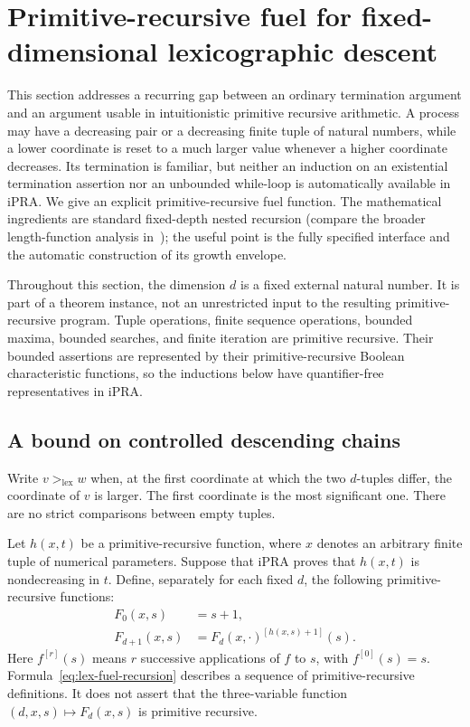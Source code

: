 \section{Primitive-recursive fuel for fixed-dimensional lexicographic descent}
\label{sec:lex-fuel}
\label{sec:descent}

This section addresses a recurring gap between an ordinary termination
argument and an argument usable in intuitionistic primitive recursive
arithmetic.  A process may have a decreasing pair or a decreasing finite
tuple of natural numbers, while a lower coordinate is reset to a much larger
value whenever a higher coordinate decreases.  Its termination is familiar,
but neither an induction on an existential termination assertion nor an
unbounded while-loop is automatically available in iPRA.  We give an
explicit primitive-recursive fuel function.  The mathematical ingredients
are standard fixed-depth nested recursion (compare the broader length-function analysis in~\cite{schmitz2014}); the useful point is the fully
specified interface and the automatic construction of its growth envelope.

Throughout this section, the dimension $d$ is a fixed external natural
number.  It is part of a theorem instance, not an unrestricted input to the
resulting primitive-recursive program.  Tuple operations, finite sequence
operations, bounded maxima, bounded searches, and finite iteration are
primitive recursive.  Their bounded assertions are represented by their
primitive-recursive Boolean characteristic functions, so the inductions
below have quantifier-free representatives in iPRA.

\subsection{A bound on controlled descending chains}

Write $v>_{\mathrm{lex}}w$ when, at the first coordinate at which the two
$d$-tuples differ, the coordinate of $v$ is larger.  The first coordinate
is the most significant one.  There are no strict comparisons between
empty tuples.

Let $h(x,t)$ be a primitive-recursive function, where $x$ denotes an
arbitrary finite tuple of numerical parameters.  Suppose that iPRA proves
that $h(x,t)$ is nondecreasing in $t$.  Define, separately for each fixed
$d$, the following primitive-recursive functions:
\begin{align}
 F_0(x,s)&=s+1,\\
 F_{d+1}(x,s)&=F_d(x,\cdot)^{[h(x,s)+1]}(s).
 \label{eq:lex-fuel-recursion}
\end{align}
Here $f^{[r]}(s)$ means $r$ successive applications of $f$ to $s$, with
$f^{[0]}(s)=s$.  Formula~\eqref{eq:lex-fuel-recursion} describes a sequence
of primitive-recursive definitions.  It does not assert that the
three-variable function $(d,x,s)\mapsto F_d(x,s)$ is primitive recursive.

